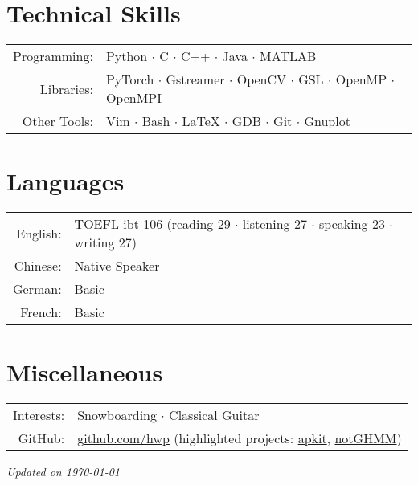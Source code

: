 \documentclass[a4paper,11pt]{article} %
\begin{document}

\section{Technical Skills}

\begin{tabular}{rl}
  Programming: & Python $\cdotp$ C $\cdotp$ C++ $\cdotp$ Java $\cdotp$ MATLAB \\
  Libraries: & PyTorch $\cdotp$ Gstreamer $\cdotp$ OpenCV $\cdotp$ GSL $\cdotp$ OpenMP $\cdotp$ OpenMPI \\
  Other Tools: & Vim $\cdotp$ Bash $\cdotp$ \LaTeX{} $\cdotp$ GDB $\cdotp$ Git $\cdotp$ Gnuplot \\
\end{tabular}


\section{Languages}

\begin{tabular}{rl}
  English: & TOEFL ibt 106 (reading 29 $\cdotp$ listening 27 $\cdotp$ speaking 23 $\cdotp$ writing 27) \\
  Chinese: & Native Speaker \\
  German: & Basic \\
  French: & Basic \\
\end{tabular}

\section{Miscellaneous}

\begin{tabular}{rl}
  Interests: & Snowboarding $\cdotp$ Classical Guitar \\
  GitHub: & \href{https://github.com/hwp}{github.com/hwp} (highlighted projects: \href{https://github.com/hwp/apkit}{apkit}, \href{https://github.com/hwp/notGHMM}{notGHMM}) \\
\end{tabular}



\vfill
\centering \footnotesize \itshape Updated on \today
\end{document}
